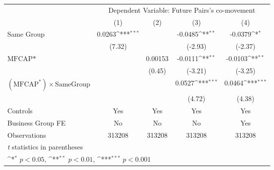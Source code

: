 {
\def\sym#1{\ifmmode^{#1}\else\(^{#1}\)\fi}
\begin{tabular}{l*{4}{c}}
\hline\hline
                &\multicolumn{4}{c}{Dependent Variable:  Future Pairs's co-movement}        \\\cmidrule(lr){2-5}
                &\multicolumn{1}{c}{(1)}         &\multicolumn{1}{c}{(2)}         &\multicolumn{1}{c}{(3)}         &\multicolumn{1}{c}{(4)}         \\
\hline
Same Group      &   0.0263\sym{***}&                  &  -0.0485\sym{**} &  -0.0379\sym{*}  \\
                &   (7.32)         &                  &  (-2.93)         &  (-2.37)         \\
[1em]
$ \text{MFCAP*} $&                  &  0.00153         &  -0.0111\sym{**} &  -0.0103\sym{**} \\
                &                  &   (0.45)         &  (-3.21)         &  (-3.25)         \\
[1em]
 $ (\text{MFCAP}^*) \times {\text{SameGroup} }  $ &                  &                  &   0.0527\sym{***}&   0.0464\sym{***}\\
                &                  &                  &   (4.72)         &   (4.38)         \\
\hline
Controls        &      Yes         &      Yes         &      Yes         &      Yes         \\
Business Group FE&       No         &       No         &       No         &      Yes         \\
Observations    &   313208         &   313208         &   313208         &   313208         \\
\hline\hline
\multicolumn{5}{l}{\footnotesize \textit{t} statistics in parentheses}\\
\multicolumn{5}{l}{\footnotesize \sym{*} \(p<0.05\), \sym{**} \(p<0.01\), \sym{***} \(p<0.001\)}\\
\end{tabular}
}
